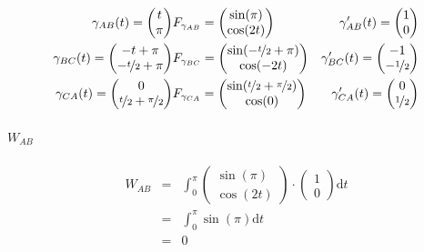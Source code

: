 \documentclass[a4paper, 11pt]{report} %
\newcommand{\dt}{\mathrm{d}t}
\begin{document}
\begin{eqnarray*}
\gamma_{AB}(t) =
\begin{pmatrix}
t\\
\pi
\end{pmatrix} &
F_{\gamma_{AB}} = 
\begin{pmatrix}
\sin(\pi)\\
\cos(2t)
\end{pmatrix} &
\gamma'_{AB}(t) =
\begin{pmatrix}
1\\
0
\end{pmatrix}\\ %
\gamma_{BC}(t) =
\begin{pmatrix}
-t+\pi\\
-\nicefrac{t}{2}+\pi
\end{pmatrix} &
F_{\gamma_{BC}} = 
\begin{pmatrix}
\sin(-\nicefrac{t}{2}+\pi)\\
\cos(-2t)
\end{pmatrix} &
\gamma'_{BC}(t) =
\begin{pmatrix}
-1\\
-\nicefrac{1}{2}
\end{pmatrix}\\ %
\gamma_{CA}(t) =
\begin{pmatrix}
0\\
\nicefrac{t}{2} +\nicefrac{\pi}{2}
\end{pmatrix} &
F_{\gamma_{CA}} = 
\begin{pmatrix}
\sin(\nicefrac{t}{2} +\nicefrac{\pi}{2})\\
\cos(0)
\end{pmatrix} &
\gamma'_{CA}(t) =
\begin{pmatrix}
0\\
\nicefrac{1}{2}
\end{pmatrix}
\end{eqnarray*}

\paragraph{$W_{AB}$}

\begin{eqnarray*}
W_{AB} & = &
\int_0^\pi
\begin{pmatrix}
\sin(\pi)\\
\cos(2t)
\end{pmatrix}
\cdot
\begin{pmatrix}
1\\
0
\end{pmatrix}
\dt\\
& = & \int_0^\pi\sin(\pi)\dt\\
& = & 0
\end{eqnarray*}
\end{document}
